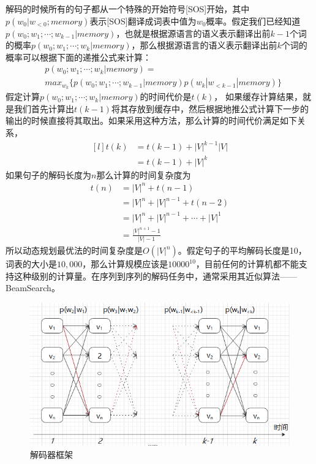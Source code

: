\documentclass[twoside,a4paper,12pt]{book}%
\begin{document}
解码的时候所有的句子都从一个特殊的开始符号[SOS]开始，其中$p(w_0|w_{<0};memory)$表示[SOS]翻译成词表中值为$w_0$概率。假定我们已经知道$p(w_0;w_1;\cdots;w_{k-1}|memory)$，也就是根据源语言的语义表示翻译出前$k-1$个词的概率$p(w_0;w_1;\cdots;w_{k}|memory)$，那么根据源语言的语义表示翻译出前$k$个词的概率可以根据下面的递推公式来计算：
$$
\begin{aligned}
&p(w_0;w_1;\cdots;w_{k}|memory)=\\
&max_{w_k}\{ p(w_0;w_1;\cdots;w_{k-1}|memory)p(w_k|w_{<k-1}|memory) \}
\end{aligned}
$$
假定计算$p(w_0;w_1;\cdots;w_{k}|memory)$的时间代价是$t(k)$，
如果缓存计算结果，就是我们首先计算出$t(k-1)$将其存放到缓存中，然后根据地推公式计算下一步的输出的时候直接将其取出。如果采用这种方法，那么计算的时间代价满足如下关系，
$$
\begin{aligned}[l]
t(k) &= t(k-1) + |V|^{k-1}|V|\\
&=t(k-1) + |V|^k
\end{aligned}
$$
如果句子的解码长度为$n$那么计算的时间复杂度为
$$
\begin{aligned}
t(n)&=|V|^n+t(n-1)\\
    &=|V|^n+|V|^{n-1}+t(n-2)\\
    &=|V|^n+|V|^{n-1}+\cdots +|V|^1\\
    &=\frac{|V|^{n+1}-1}{|V|-1}
\end{aligned}
$$
所以动态规划最优法的时间复杂度是$O(|V|^n)$。假定句子的平均解码长度是10，词表的大小是$10,000$，那么计算规模应该是$10000^{10}$，目前任何的计算机都不能支持这种级别的计算量。在序列到序列的解码任务中，通常采用其近似算法——BeamSearch。
\begin{figure}[htbp]
	\begin{center}
		\includegraphics[width=5.8in]{figures/nmt_search1.png}
		\caption{解码器框架}
		\label{fig:nmt_search1}
	\end{center}
\end{figure}
\end{document}
